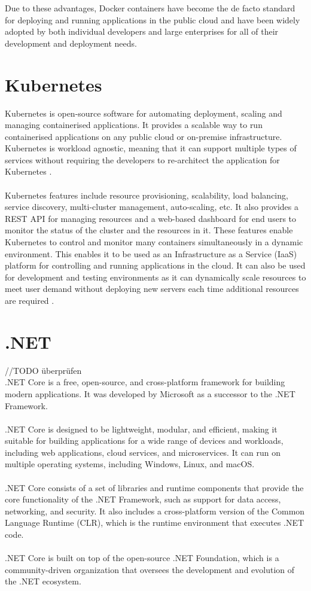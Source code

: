 \documentclass[BIF,Master,nenglish]{twbook}%
\begin{document}
\noindent
Due to these advantages, Docker containers have become the de facto standard for deploying and running applications in the public cloud and have been widely adopted by both individual developers and large enterprises for all of their development and deployment needs.


\section{Kubernetes}
Kubernetes is open-source software for automating deployment, scaling and managing containerised applications. It provides a scalable way to run containerised applications on any public cloud or on-premise infrastructure. Kubernetes is workload agnostic, meaning that it can support multiple types of services without requiring the developers to re-architect the application for Kubernetes \cite{luk2018}.
\\
\\
Kubernetes features include resource provisioning, scalability, load balancing, service discovery, multi-cluster management, auto-scaling, etc. It also provides a REST API for managing resources and a web-based dashboard for end users to monitor the status of the cluster and the resources in it. These features enable Kubernetes to control and monitor many containers simultaneously in a dynamic environment. This enables it to be used as an Infrastructure as a Service (IaaS) platform for controlling and running applications in the cloud. It can also be used for development and testing environments as it can dynamically scale resources to meet user demand without deploying new servers each time additional resources are required \cite{kubernetes}.

\section{.NET}
//TODO überprüfen
\\
.NET Core is a free, open-source, and cross-platform framework for building modern applications. It was developed by Microsoft as a successor to the .NET Framework.
\\
\\
.NET Core is designed to be lightweight, modular, and efficient, making it suitable for building applications for a wide range of devices and workloads, including web applications, cloud services, and microservices. It can run on multiple operating systems, including Windows, Linux, and macOS.
\\
\\
.NET Core consists of a set of libraries and runtime components that provide the core functionality of the .NET Framework, such as support for data access, networking, and security. It also includes a cross-platform version of the Common Language Runtime (CLR), which is the runtime environment that executes .NET code.
\\
\\
.NET Core is built on top of the open-source .NET Foundation, which is a community-driven organization that oversees the development and evolution of the .NET ecosystem.
\end{document}
